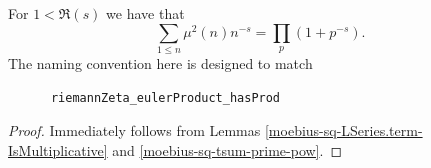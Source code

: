 \begin{theorem}
\label{moebius_sq_LSeries_eulerProduct_hasProd}
\leanok
For $1<\Re(s)$ we have that
    $$\sum_{1\leq n}\mu^2(n)n^{-s}=\prod_p(1+p^{-s}).$$
    The naming convention here is designed to match
    \begin{verbatim}
      riemannZeta_eulerProduct_hasProd
    \end{verbatim}
\end{theorem}
\begin{proof}
\leanok
Immediately follows from Lemmas \ref{moebius-sq-LSeries.term-IsMultiplicative} and \ref{moebius-sq-tsum-prime-pow}.
\end{proof}
